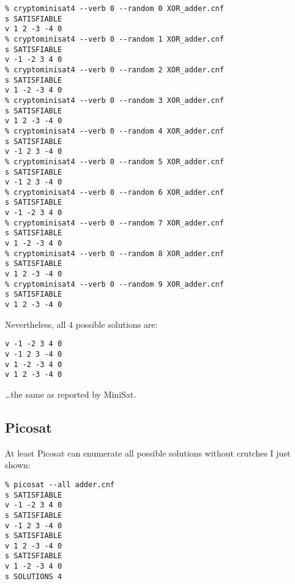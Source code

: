 \begin{lstlisting}
% cryptominisat4 --verb 0 --random 0 XOR_adder.cnf
s SATISFIABLE
v 1 2 -3 -4 0
% cryptominisat4 --verb 0 --random 1 XOR_adder.cnf
s SATISFIABLE
v -1 -2 3 4 0
% cryptominisat4 --verb 0 --random 2 XOR_adder.cnf
s SATISFIABLE
v 1 -2 -3 4 0
% cryptominisat4 --verb 0 --random 3 XOR_adder.cnf
s SATISFIABLE
v 1 2 -3 -4 0
% cryptominisat4 --verb 0 --random 4 XOR_adder.cnf
s SATISFIABLE
v -1 2 3 -4 0
% cryptominisat4 --verb 0 --random 5 XOR_adder.cnf
s SATISFIABLE
v -1 2 3 -4 0
% cryptominisat4 --verb 0 --random 6 XOR_adder.cnf
s SATISFIABLE
v -1 -2 3 4 0
% cryptominisat4 --verb 0 --random 7 XOR_adder.cnf
s SATISFIABLE
v 1 -2 -3 4 0
% cryptominisat4 --verb 0 --random 8 XOR_adder.cnf
s SATISFIABLE
v 1 2 -3 -4 0
% cryptominisat4 --verb 0 --random 9 XOR_adder.cnf
s SATISFIABLE
v 1 2 -3 -4 0
\end{lstlisting}

Nevertheless, all 4 possible solutions are:

\begin{lstlisting}
v -1 -2 3 4 0
v -1 2 3 -4 0
v 1 -2 -3 4 0
v 1 2 -3 -4 0
\end{lstlisting}

\dots the same as reported by MiniSat.

\subsection{Picosat}

At least Picosat can enumerate all possible solutions without crutches I just shown:

\begin{lstlisting}
% picosat --all adder.cnf
s SATISFIABLE
v -1 -2 3 4 0
s SATISFIABLE
v -1 2 3 -4 0
s SATISFIABLE
v 1 2 -3 -4 0
s SATISFIABLE
v 1 -2 -3 4 0
s SOLUTIONS 4
\end{lstlisting}











